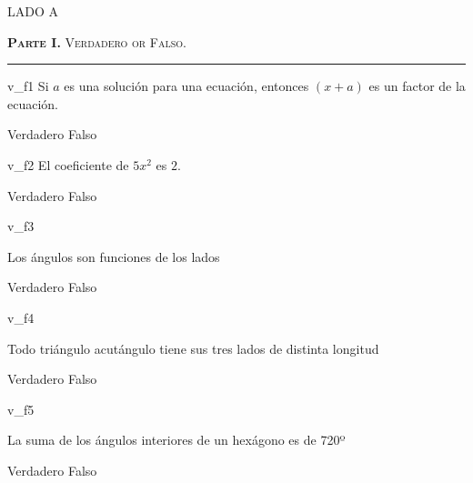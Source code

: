 \documentclass[a4paper]{article}
\begin{document}
\parbox{6in}{\textsc{{LADO A}}


\parbox{5in}{
{\textsc{\textbf{Parte I.} Verdadero or Falso.}}}}


\hrule 


\begin{question}{v_f1}
Si \(a\) es una solución para una ecuación, entonces \((x + a)\) es un factor de la ecuación. 

\begin{choices}
    \choice Verdadero
    \choice Falso
\end{choices}

 
\end{question}

\begin{question}{v_f2}
El coeficiente de \(5x^2\) es \(2\).

\begin{choices}
    \choice Verdadero
    \choice Falso
\end{choices}


\end{question}

\begin{question}{v_f3}

Los ángulos son funciones de los lados

\begin{choices}
    \choice Verdadero
    \choice Falso
\end{choices}
 
\end{question}

\begin{question}{v_f4}

Todo triángulo acutángulo tiene sus tres lados de distinta longitud

\begin{choices}
    \choice Verdadero
    \choice Falso
\end{choices}
 
\end{question}

\begin{question}{v_f5}

 La suma de los ángulos interiores de un hexágono es de 720º

 \begin{choices}
    \choice Verdadero
    \choice Falso
\end{choices}
 
\end{question}
\end{document}
